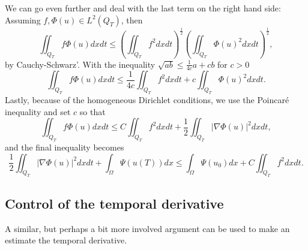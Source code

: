 \documentclass[11pt, a4paper]{article}
\begin{document}
\begin{obs}
We can go even further and deal with the last term on the right hand side: Assuming $f,\Phi(u) \in L^2(Q_T)$, then
\begin{equation*}
\iint_{Q_T} f\Phi(u)dxdt \leq \left(\iint_{Q_T} f^2 dxdt\right)^\frac{1}{2}\left(\iint_{Q_T} \Phi(u)^2 dxdt\right)^\frac{1}{2},
\end{equation*}
by Cauchy-Schwarz'. With the inequality $\sqrt{ab} \leq \frac{1}{4c}a + cb$ for $c>0$
\begin{equation*}
\iint_{Q_T} f\Phi(u)dxdt \leq \frac{1}{4c}\iint_{Q_T}f^2dxdt + c\iint_{Q_T}\Phi(u)^2dxdt.
\end{equation*}
Lastly, because of the homogeneous Dirichlet conditions, we use the Poincaré inequality and set $c$ so that
\begin{equation}
\label{using_Poincare}
\iint_{Q_T} f\Phi(u)dxdt \leq C\iint_{Q_T}f^2dxdt + \frac{1}{2}\iint_{Q_T}|\nabla \Phi(u)|^2dxdt,
\end{equation}
and the final inequality becomes
\begin{equation}
\frac{1}{2}\iint_{Q_T}|\nabla \Phi(u)|^2dxdt + \int_\Omega \Psi(u(T))dx \leq \int_\Omega \Psi(u_0)dx + C\iint_{Q_T}f^2dxdt.
\end{equation}
\end{obs}
\subsection{Control of the temporal derivative}
A similar, but perhaps a bit more involved argument can be used to make an estimate the temporal derivative.
\end{document}
